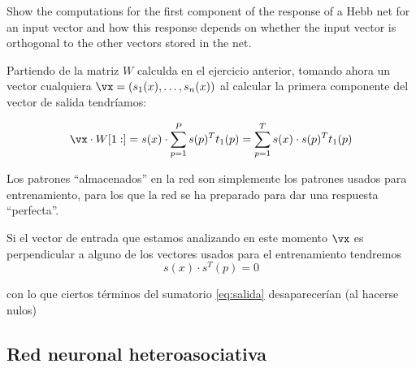 \begin{problem}[2]
Show the computations for the first component of the response of a Hebb net for an input vector and how this response depends on whether the input vector is orthogonal to the other vectors stored in the net.
\solution


Partiendo de la matriz $W$ calculda en el ejercicio anterior, tomando ahora un vector cualquiera $\vx = (s_1(x),\ldots, s_n(x))$ al calcular la primera componente del vector de salida tendríamos:

\begin{equation}\label{eq:salida}
\vx \cdot W[1:] = s(x) \cdot \sum_{p=1}^Ps(p)^Tt_1(p) = \sum_{p=1}^Ts(x)\cdot s(p)^Tt_1(p)
\end{equation}

Los patrones ``almacenados'' en la red son simplemente los patrones usados para entrenamiento, para los que la red se ha preparado para dar una respuesta ``perfecta''.

Si el vector de entrada que estamos analizando en este momento $\vx$ es perpendicular a alguno de los vectores usados para el entrenamiento tendremos
\[s(x)\cdot s^T(p) = 0\]

con lo que ciertos términos del sumatorio \ref{eq:salida} desaparecerían (al hacerse nulos)

\end{problem}

\subsection{Red neuronal heteroasociativa}

